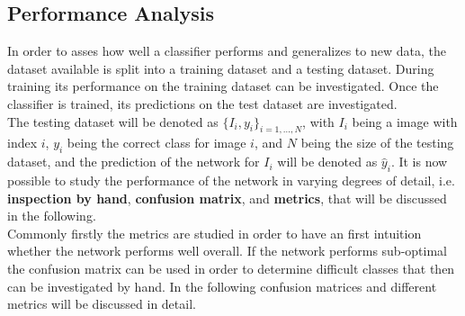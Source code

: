 \subsection{Performance Analysis}

In order to asses how well a classifier performs and generalizes to new data, the dataset available is split into a training dataset and a testing dataset. During training its performance on the training dataset can be investigated. Once the classifier is trained, its predictions on the test dataset are investigated. \\

The testing dataset will be denoted as $\{I_i,y_i\}_{i=1,\dots ,N} $, with $I_i$ being a image with index $i$, $y_i$ being the correct class for image $i$, and $N$ being the size of the testing dataset, and the prediction of the network for $I_i$ will be denoted as $\hat{y}_i$. It is now possible to study the performance of the network in varying degrees of detail, i.e. \textbf{inspection by hand}, \textbf{confusion matrix}, and \textbf{metrics}, that will be discussed in the following.\\



Commonly firstly the metrics are studied in order to have an first intuition whether the network performs well overall. If the network performs sub-optimal the confusion matrix can be used in order to determine difficult classes that then can be investigated by hand. In the following confusion matrices and different metrics will be discussed in detail.


